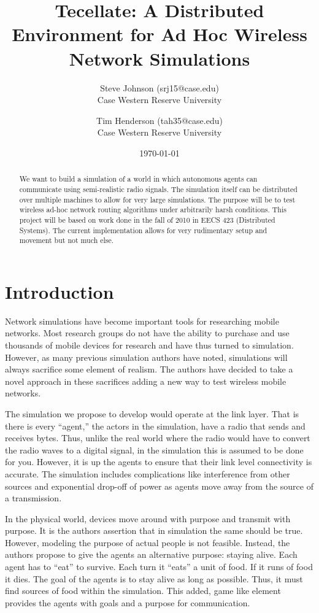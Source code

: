 \documentclass[12pt]{article}
\title{Tecellate: A Distributed Environment for Ad Hoc Wireless Network Simulations}
\author{
        Steve Johnson (srj15@case.edu)\\
        Case Western Reserve University\\
        \and Tim Henderson (tah35@case.edu)\\
        Case Western Reserve University
}
\date{\today}
\begin{document}
\doublespacing
\maketitle


\begin{abstract}
    We want to build a simulation of a world in which autonomous agents can communicate using semi-realistic radio signals. The simulation itself can be distributed over multiple machines to allow for very large simulations. The purpose will be to test wireless ad-hoc network routing algorithms under arbitrarily harsh conditions.
    This project will be based on work done in the fall of 2010 in EECS 423 (Distributed Systems). The current implementation allows for very rudimentary setup and movement but not much else.
\end{abstract}

\section{Introduction}

Network simulations have become important tools for researching mobile networks. Most research groups do not have the ability to purchase and use thousands of mobile devices for research and have thus turned to simulation. However, as many previous simulation authors have noted, simulations will always sacrifice some element of realism. The authors have decided to take a novel approach in these sacrifices adding a new way to test wireless mobile networks.

The simulation we propose to develop would operate at the link layer. That is there is every ``agent,'' the actors in the simulation, have a radio that sends and receives bytes. Thus, unlike the real world where the radio would have to convert the radio waves to a digital signal, in the simulation this is assumed to be done for you. However, it is up the agents to ensure that their link level connectivity is accurate. The simulation includes complications like interference from other sources and exponential drop-off of power as agents move away from the source of a transmission.

In the physical world, devices move around with purpose and transmit with purpose. It is the authors assertion that in simulation the same should be true. However, modeling the purpose of actual people is not feasible. Instead, the authors propose to give the agents an alternative purpose: staying alive. Each agent has to ``eat'' to survive. Each turn it ``eats'' a unit of food. If it runs of food it dies. The goal of the agents is to stay alive as long as possible. Thus, it must find sources of food within the simulation. This added, game like element provides the agents with goals and a purpose for communication.
\end{document}
